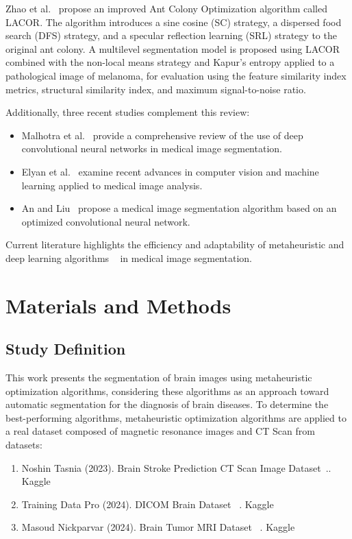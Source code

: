 \documentclass{elsarticle}
\begin{document}
\noindent Zhao et al.~\cite{Zhao2023} propose an improved Ant Colony Optimization algorithm called LACOR. The algorithm introduces a sine cosine (SC) strategy, a dispersed food search (DFS) strategy, and a specular reflection learning (SRL) strategy to the original ant colony. A multilevel segmentation model is proposed using LACOR combined with the non-local means strategy and Kapur's entropy applied to a pathological image of melanoma, for evaluation using the feature similarity index metrics, structural similarity index, and maximum signal-to-noise ratio.

\noindent Additionally, three recent studies complement this review:

\begin{itemize}
    \item Malhotra et al.~\cite{Chakraborty2022} provide a comprehensive review of the use of deep convolutional neural networks in medical image segmentation.
    \item Elyan et al.~\cite{Elyan2022} examine recent advances in computer vision and machine learning applied to medical image analysis.
    \item An and Liu~\cite{An2020} propose a medical image segmentation algorithm based on an optimized convolutional neural network.
\end{itemize}

\noindent Current literature highlights the efficiency and adaptability of metaheuristic and deep learning algorithms ~\cite{jones2023automated} in medical image segmentation.


\section{Materials and Methods}
\subsection{Study Definition}
\noindent This work presents the segmentation of brain images using metaheuristic optimization algorithms, considering these algorithms as an approach toward automatic segmentation for the diagnosis of brain diseases. To determine the best-performing algorithms, metaheuristic optimization algorithms are applied to a real dataset composed of magnetic resonance images and CT Scan from datasets:
\begin{enumerate}
    \item Noshin Tasnia (2023). Brain Stroke Prediction CT Scan Image Dataset~\cite{Tasnia2023}.. Kaggle
    \item Training Data Pro (2024). DICOM Brain Dataset ~\cite{TrainingDataPro2024}. Kaggle
    \item Masoud Nickparvar (2024). Brain Tumor MRI Dataset ~\cite{Nickparvar2024}. Kaggle

\end{enumerate}
\end{document}
